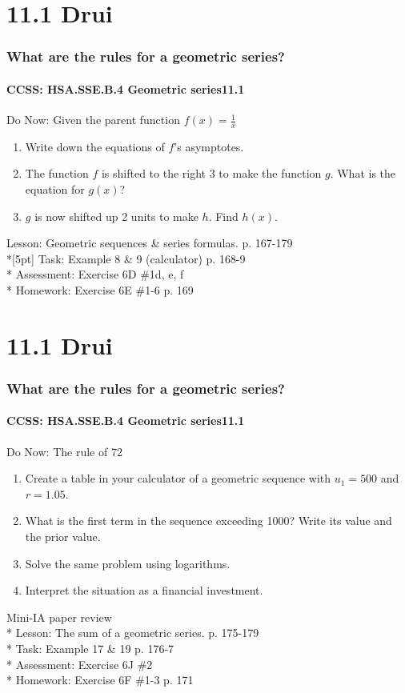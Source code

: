 \documentclass{beamer}
\begin{document}
  \section{11.1 Drui}
  \frame
  {
    \frametitle{What are the rules for a geometric series?}
    \framesubtitle{CCSS: HSA.SSE.B.4 Geometric series\qquad \alert{11.1}}

    \begin{block}{Do Now: Given the parent function $f(x)=\frac{1}{x}$}
    \begin{enumerate}
        \item Write down the equations of $f$'s asymptotes.
        \item The function $f$ is shifted to the right 3 to make the function $g$. What is the equation for $g(x)$?
        \item $g$ is now shifted up 2 units to make $h$. Find $h(x)$.
    \end{enumerate}
    \end{block}
    Lesson: Geometric sequences \& series formulas. p. 167-179\\*[5pt]
    Task: Example 8 \& 9 (calculator) p. 168-9\\*
    Assessment: Exercise 6D \#1d, e, f\\*
    Homework: Exercise 6E \#1-6 p. 169
  }


  \section{11.1 Drui}
  \frame
  {
    \frametitle{What are the rules for a geometric series?}
    \framesubtitle{CCSS: HSA.SSE.B.4 Geometric series\qquad \alert{11.1}}

    \begin{block}{Do Now: The rule of 72}
    \begin{enumerate}
        \item Create a table in your calculator of a geometric sequence with $u_1=500$ and $r=1.05$.
        \item What is the first term in the sequence exceeding 1000? Write its value and the prior value.
        \item Solve the same problem using logarithms.
        \item Interpret the situation as a financial investment.
    \end{enumerate}
    \end{block}
    Mini-IA paper review\\*
    Lesson: The sum of a geometric series. p. 175-179\\*
    Task: Example 17 \& 19 p. 176-7\\*
    Assessment: Exercise 6J \#2\\*
    Homework: Exercise 6F \#1-3 p. 171
  }
\end{document}
